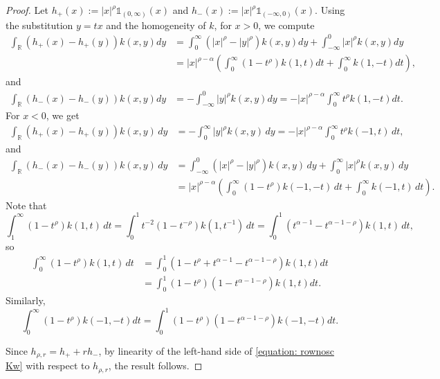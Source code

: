 \documentclass[10pt,a4paper]{amsart}
\newcommand{\R}{\mathbb{R}}
\begin{document}
\begin{proof}
Let  $h_+(x) := |x|^{\rho}\mathds{1}_{(0, \infty)}(x)$ and $h_-(x) := |x|^{\rho}\mathds{1}_{(-\infty, 0)}(x)$. Using the substitution $y = tx$ and the homogeneity of $k$, for $x > 0$, we compute
\begin{align*}
    \int_{\R}(h_+(x) - h_+(y))k(x, y)dy 
    &= \int_{0}^{\infty}(|x|^\rho - |y|^\rho)k(x, y)dy + \int_{-\infty}^{0}|x|^\rho k(x, y)dy \\
    &= |x|^{\rho-\alpha} \left( \int_{0}^{\infty}(1 - t^\rho)k(1, t)dt + \int_{0}^{\infty}k(1, -t)dt \right),
\end{align*}
and
\begin{align*}    
    \int_{\R}(h_-(x) - h_-(y))k(x, y)dy 
    &= -\int_{-\infty}^{0}|y|^\rho k(x, y)dy 
    = -|x|^{\rho - \alpha} \int_{0}^{\infty}t^\rho k(1, -t)dt.
\end{align*}
For $x < 0$, we get
\begin{align*}
    \int_{\R}(h_+(x) - h_+(y))k(x, y)\,dy 
    &= -\int_{0}^{\infty}|y|^\rho k(x, y)\,dy 
    = -|x|^{\rho - \alpha} \int_{0}^{\infty}t^\rho k(-1, t)\,dt,
\end{align*}
and
\begin{align*}
    \int_{\R}(h_-(x) - h_-(y))k(x, y)\,dy 
    &= \int_{-\infty}^{0}(|x|^\rho - |y|^\rho)k(x, y)\,dy + \int_{0}^{\infty}|x|^\rho k(x, y)\,dy \\
    &= |x|^{\rho-\alpha} \left( \int_{0}^{\infty}(1 - t^\rho)k(-1, -t)\,dt + \int_{0}^{\infty}k(-1, t)\,dt \right).
\end{align*}
Note that
\[
\int_{1}^{\infty}(1 - t^\rho)k(1, t)\,dt 
= \int_{0}^{1}t^{-2}(1 - t^{-\rho})k(1, t^{-1})\,dt 
= \int_{0}^{1}(t^{\alpha - 1} - t^{\alpha - 1- \rho})k(1, t)\,dt,
\]
so 
\begin{align*}
\int_{0}^{\infty}(1 - t^\rho)k(1, t)\,dt 
&= \int_{0}^{1}(1 - t^\rho + t^{\alpha - 1} - t^{\alpha - 1- \rho})k(1, t)dt \\
&= \int_{0}^{1}(1 - t^\rho)(1 - t^{\alpha - 1- \rho})k(1, t)dt.
\end{align*}
Similarly,
\[
\int_{0}^{\infty}(1 - t^\rho)k(-1, -t)dt = \int_{0}^{1}(1 - t^\rho)(1 - t^{\alpha - 1- \rho})k(-1, -t)dt.
\]

Since $h_{\rho, r} = h_+ + rh_-$, by linearity of the left-hand side of \eqref{equation: rownosc Kw} with respect to $h_{\rho, r}$, the result follows.
\end{proof}
\end{document}
